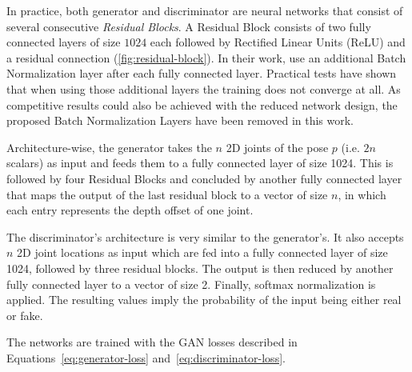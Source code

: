 

In practice, both generator and discriminator are neural networks that consist of several consecutive \textit{Residual Blocks}.
A Residual Block consists of two fully connected layers of size $1024$ each followed by Rectified Linear Units (ReLU) and a residual connection (\autoref{fig:residual-block}).
In their work, \citet{drover18} use an additional Batch Normalization layer \cite{ioffe15} after each fully connected layer.
Practical tests have shown that when using those additional layers the training does not converge at all.
As competitive results could also be achieved with the reduced network design, the proposed Batch Normalization Layers have been removed in this work.

Architecture-wise, the generator takes the $n$ 2D joints of the pose $p$ (i.e. $2n$ scalars) as input and feeds them to a fully connected layer of size 1024.
This is followed by four Residual Blocks and concluded by another fully connected layer that maps the output of the last residual block to a vector of size $n$, in which each entry represents the depth offset of one joint.

The discriminator's architecture is very similar to the generator's. 
It also accepts $n$ 2D joint locations as input which are fed into a fully connected layer of size 1024, followed by three residual blocks.
The output is then reduced by another fully connected layer to a vector of size 2.
Finally, softmax normalization is applied.
The resulting values imply the probability of the input being either real or fake.

The networks are trained with the GAN losses described in Equations~\ref{eq:generator-loss} and~\ref{eq:discriminator-loss}.